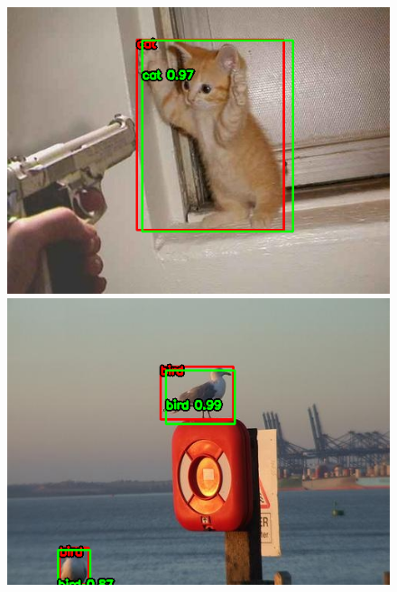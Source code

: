 \documentclass{article}
\begin{document}
\begin{figure}[htbp]
  \vspace{0.5cm} %
  \begin{minipage}{0.24\textwidth}
      \centering
      \includegraphics[width=\linewidth]{results_lg/cat_16.png}
  \end{minipage}
  \begin{minipage}{0.24\textwidth}
      \centering
      \includegraphics[width=\linewidth]{results_lg/bird_3.png}
  \end{minipage}
  \begin{minipage}{0.24\textwidth}
      \centering

\end{minipage}
\end{figure}
\end{document}
